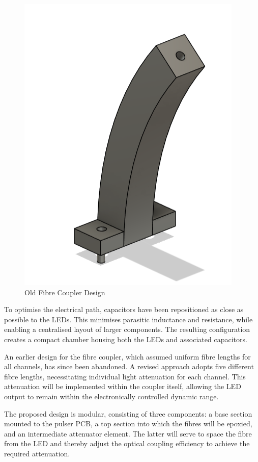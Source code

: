 \documentclass[a4paper,11pt]{article}
\begin{document}
\begin{figure}[htbp]
\centering
\includegraphics[scale=0.5]{OldFibreCouplerDesign.png}
\caption{Old Fibre Coupler Design\label{fig:OldFibreCouplerDesign}}
\end{figure}

To optimise the electrical path, capacitors have been repositioned as close as possible to the LEDs. This minimises parasitic inductance and resistance, while enabling a centralised layout of larger components. The resulting configuration creates a compact chamber housing both the LEDs and associated capacitors.

An earlier design for the fibre coupler, which assumed uniform fibre lengths for all channels, has since been abandoned. A revised approach adopts five different fibre lengths, necessitating individual light attenuation for each channel. This attenuation will be implemented within the coupler itself, allowing the LED output to remain within the electronically controlled dynamic range.

The proposed design is modular, consisting of three components: a base section mounted to the pulser PCB, a top section into which the fibres will be epoxied, and an intermediate attenuator element. The latter will serve to space the fibre from the LED and thereby adjust the optical coupling efficiency to achieve the required attenuation.
\end{document}
